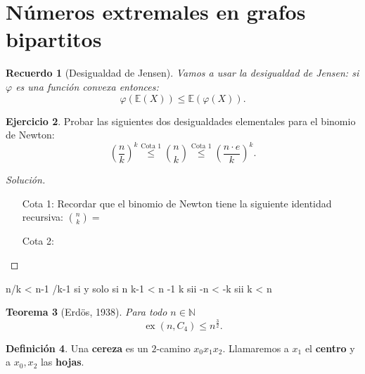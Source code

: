 \documentclass[12pt]{report}
\theoremstyle{plain}
\newtheorem{theorem}{Teorema}[section]
\newtheorem{recuerdo}[theorem]{Recuerdo}
\theoremstyle{definition}
\newtheorem{definition}[theorem]{Definición}
\newtheorem{exercise}[theorem]{Ejercicio}
\newenvironment{solution}{\begin{proof}[Solución]}{\end{proof}}
\newcommand{\naturals}{\mathbb{N}}
\newcommand{\ex}[2]{\operatorname{ex} (#1, #2)}
\begin{document}
\section{Números extremales en grafos bipartitos}


\begin{recuerdo}[Desigualdad de Jensen]
Vamos a usar la desigualdad de Jensen: si $\varphi$ es una función convexa entonces:
\[
    \boxed{\varphi(\mathbb E (X)) \leq \mathbb E (\varphi (X)).}
\]
\end{recuerdo}


\begin{exercise}
Probar las siguientes dos desigualdades elementales para el binomio de Newton:
\[
    \left(\frac n k \right)^k \overset{\text{Cota 1}}{\leq} \binom n k \overset{\text{Cota 1}}{\leq} \left(\frac{n \cdot e}{k}\right)^k.
\]
\end{exercise}
\begin{solution}
\begin{enumerate}
\item[Cota 1:] Recordar que el binomio de Newton tiene la siguiente identidad recursiva: $\binom n k = $
\item[Cota 2:]
\end{enumerate}
\end{solution}

n/k < n-1 /k-1 si y solo si n k-1 < n -1 k sii -n < -k sii k < n


\begin{theorem}[Erdös, 1938]
Para todo $n \in \naturals$
\[
    \ex n {C_4} \leq n^{\frac 3 2}.
\]
\end{theorem}

\begin{definition}
Una \textbf{cereza} es un $2$-camino $x_0 x_1 x_2$. Llamaremos a $x_1$ el \textbf{centro} y a $x_0,x_2$ las \textbf{hojas}.
\end{definition}

\end{document}
